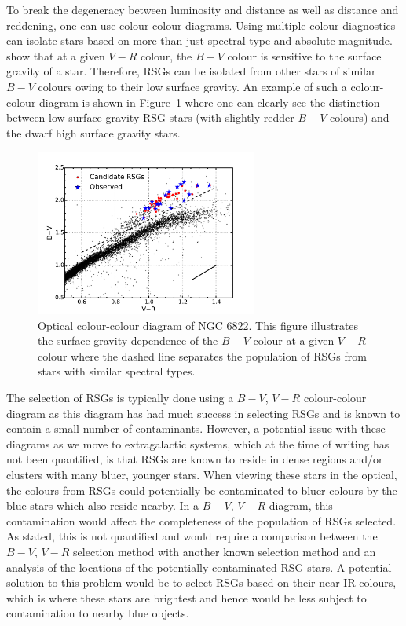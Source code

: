 {To break the degeneracy between luminosity and distance as well as distance and reddening, one can use colour-colour diagrams.
Using multiple colour diagnostics can isolate stars based on more than just spectral type and absolute magnitude.
\cite{1998ApJ...501..153M} show that at a given $V-R$ colour, the $B-V$ colour is sensitive to the surface gravity of a star.
Therefore, RSGs can be isolated from other stars of similar $B-V$ colours owing to their low surface gravity.
An example of such a colour-colour diagram is shown in Figure~\ref{fig:CCD} where one can clearly see the distinction between low surface gravity RSG stars (with slightly redder $B-V$ colours) and the dwarf high surface gravity stars.

\begin{figure}
 \centering
 \includegraphics[width=0.65\textwidth]{intro/N6822_bvr}
 \caption[$B-V$, $V-R$]{Optical colour-colour diagram of NGC 6822. This figure illustrates the surface gravity dependence of the $B-V$ colour at a given $V-R$ colour where the dashed line separates the population of RSGs from stars with similar spectral types.
 \label{fig:CCD}}
\end{figure}

The selection of RSGs is typically done using a $B-V$, $V-R$ colour-colour diagram as this diagram has had much success in selecting RSGs and is known to contain a small number of contaminants.
However, a potential issue with these diagrams as we move to extragalactic systems, which at the time of writing has not been quantified, is that RSGs are known to reside in dense regions and/or clusters with many bluer, younger stars.
When viewing these stars in the optical, the colours from RSGs could potentially be contaminated to bluer colours by the blue stars which also reside nearby.
In a $B-V$, $V-R$ diagram, this contamination would affect the completeness of the population of RSGs selected.
As stated, this is not quantified and would require a comparison between the $B-V$, $V-R$ selection method with another known selection method and an analysis of the locations of the potentially contaminated RSG stars.
A potential solution to this problem would be to select RSGs based on their near-IR colours, which is where these stars are brightest and hence would be less subject to contamination to nearby blue objects.

}
